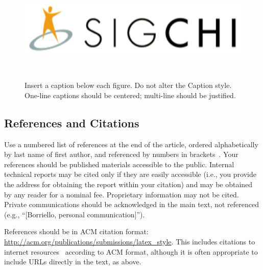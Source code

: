 \documentclass{sigchi}
\begin{document}
\begin{figure}
\centering
  \includegraphics[width=0.9\columnwidth]{figures/sigchi-logo}
  \caption{Insert a caption below each figure. Do not alter the
    Caption style.  One-line captions should be centered; multi-line
    should be justified. }~\label{fig:figure1}
\end{figure}

\subsection{References and Citations}

Use a numbered list of references at the end of the article, ordered
alphabetically by last name of first author, and referenced by numbers
in
brackets~\cite{acm_categories,ethics,Klemmer:2002:WSC:503376.503378}.
Your references should be published materials accessible to the
public. Internal technical reports may be cited only if they are
easily accessible (i.e., you provide the address for obtaining the
report within your citation) and may be obtained by any reader for a
nominal fee. Proprietary information may not be cited. Private
communications should be acknowledged in the main text, not referenced
(e.g., ``[Borriello, personal communication]'').

References should be in ACM citation format:
\url{http://acm.org/publications/submissions/latex_style}. This
includes citations to internet
resources~\cite{acm_categories,cavender:writing,CHINOSAUR:venue,psy:gangnam}
according to ACM format, although it is often appropriate to include
URLs directly in the text, as above.


\end{document}
